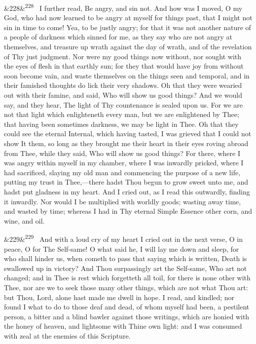 \documentclass[12pt]{article}
\newcommand{\para}[1][]{\par\noindent\ifx&#1&\else\textsuperscript{\footnotesize #1}~\fi}
\begin{document}
\para[228] I further read, Be angry, and sin not. And how was I moved, O my God, who had now learned to be angry at myself for things past, that I might not sin in time to come! Yea, to be justly angry; for that it was not another nature of a people of darkness which sinned for me, as they say who are not angry at themselves, and treasure up wrath against the day of wrath, and of the revelation of Thy just judgment. Nor were my good things now without, nor sought with the eyes of flesh in that earthly sun; for they that would have joy from without soon become vain, and waste themselves on the things seen and temporal, and in their famished thoughts do lick their very shadows. Oh that they were wearied out with their famine, and said, Who will show us good things? And we would say, and they hear, The light of Thy countenance is sealed upon us. For we are not that light which enlighteneth every man, but we are enlightened by Thee; that having been sometimes darkness, we may be light in Thee. Oh that they could see the eternal Internal, which having tasted, I was grieved that I could not show It them, so long as they brought me their heart in their eyes roving abroad from Thee, while they said, Who will show us good things? For there, where I was angry within myself in my chamber, where I was inwardly pricked, where I had sacrificed, slaying my old man and commencing the purpose of a new life, putting my trust in Thee,---there hadst Thou begun to grow sweet unto me, and hadst put gladness in my heart. And I cried out, as I read this outwardly, finding it inwardly. Nor would I be multiplied with worldly goods; wasting away time, and wasted by time; whereas I had in Thy eternal Simple Essence other corn, and wine, and oil.

\para[229] And with a loud cry of my heart I cried out in the next verse, O in peace, O for The Self-same! O what said he, I will lay me down and sleep, for who shall hinder us, when cometh to pass that saying which is written, Death is swallowed up in victory? And Thou surpassingly art the Self-same, Who art not changed; and in Thee is rest which forgetteth all toil, for there is none other with Thee, nor are we to seek those many other things, which are not what Thou art: but Thou, Lord, alone hast made me dwell in hope. I read, and kindled; nor found I what to do to those deaf and dead, of whom myself had been, a pestilent person, a bitter and a blind bawler against those writings, which are honied with the honey of heaven, and lightsome with Thine own light: and I was consumed with zeal at the enemies of this Scripture.
\end{document}
